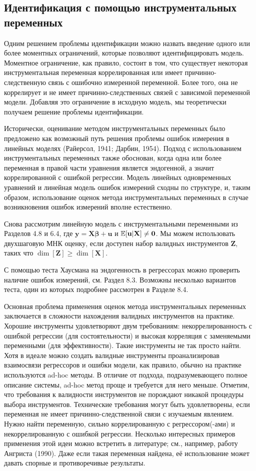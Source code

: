 \subsection{Идентификация с помощью инструментальных переменных} 

Одним решением проблемы идентификации можно назвать введение одного или более моментных ограничений, которые позволяют идентифицировать модель. Моментное ограничение, как правило, состоит в том, что существует некоторая инструментальная переменная коррелированная или имеет причинно-следственную связь с ошибочно измеренной переменной. Более того, она не коррелирует и не имеет причинно-следственных связей с зависимой переменной модели. Добавляя это ограничение в исходную модель, мы теоретически получаем решение проблемы идентификации.

Исторически, оценивание методом инструментальных переменных было предложено как возможный путь  решения проблемы ошибок измерения в линейных моделях (Райерсол, 1941; Дарбин, 1954). Подход с использованием инструментальных переменных также обоснован, когда одна или более переменная в правой части уравнения является эндогенной, а значит коррелированной с ошибкой регрессии. Модель линейных одновременных уравнений и линейная модель ошибок измерений сходны по структуре, и, таким образом, использование оценок метода инструментальных переменных в случае возникновения ошибок измерений вполне естественно.

Снова рассмотрим  линейную модель с инструментальными переменными из Разделов 4.8 и 6.4, где $\mathbf{y=X\beta+u}$ и $\mathbb{E}[\mathbf{u|X}] \neq \mathbf{0}$. Мы можем использовать двухшаговую МНК оценку, если доступен набор валидных инструментов $\mathbf{Z}$, таких что $\dim[\mathbf{Z}] \geqslant \dim[\mathbf{X}]$.

С помощью теста Хаусмана на эндогенность в регрессорах можно проверить наличие ошибок измерений, см. Раздел 8.3. Возможны несколько вариантов теста, один из которых подробнее рассмотрен в Разделе 8.4.

Основная проблема применения оценок метода инструментальных переменных заключается в сложности нахождения валидных инструментов на практике. Хорошие инструменты удовлетворяют двум требованиям: некоррелированность с ошибкой регрессии (для состоятельности) и высокая корреляция с заменяемыми переменными (для эффективности). Такие инструменты не так просто найти. Хотя в идеале можно создать валидные инструменты проанализировав  взаимосвязи регрессоров и ошибки модели, как правило, обычно на практике используются ad-hoc методы. В отличие от подхода, подразумевающего полное описание системы, ad-hoc метод проще и требуется для него меньше. Отметим, что требования к валидности инструментов не порождают никакой процедуры выбора инструментов. Технические требования могут быть удовлетворены, если переменная не имеет причинно-следственной связи с изучаемым явлением. Нужно найти переменную, сильно коррелированную с регрессором(-ами) и некоррелированную с ошибкой регрессии. Несколько интересных примеров применения этой идеи можно встретить в литературе; см., например, работу Ангриста (1990). Даже если такая переменная найдена, её использование может давать  спорные и противоречивые результаты.

